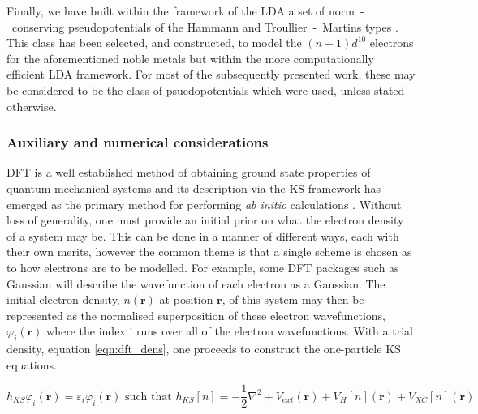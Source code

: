 Finally, we have built within the framework of the LDA a set of norm~-~conserving pseudopotentials of the Hammann \cite{Hamann} and Troullier~-~Martins \cite{Troullier} types \cite{FHI}. This class has been selected, and constructed, to model the $(n-1)d^{10}$ electrons for the aforementioned noble metals but within the more computationally efficient LDA framework. For most of the subsequently presented work, these may be considered to be the class of psuedopotentials which were used, unless stated otherwise.


\subsubsection{Auxiliary and numerical considerations}
\label{sec:dft_nums}

DFT is a well established method of obtaining ground state properties of quantum mechanical systems and its description via the KS framework has emerged as the primary method for performing \textit{ab initio} calculations \cite{K_Burke_Perspectives,Becke_Perspective}. Without loss of generality, one must provide an initial prior on what the electron density of a system may be. This can be done in a manner of different ways, each with their own merits, however the common theme is that a single scheme is chosen as to how electrons are to be modelled. For example, some DFT packages such as Gaussian will describe the wavefunction of each electron as a Gaussian. The initial electron density, $n(\textbf{r})$ at position $\textbf{r}$, of this system may then be represented as the normalised superposition of these electron wavefunctions, ${\varphi_{i}(\textbf{r})}$ where the index i runs over all of the electron wavefunctions. With a trial density, equation \ref{eqn:dft_dens}, one proceeds to construct the one-particle KS equations.

\begin{equation}
    h_{KS}\varphi_{i}(\textbf{r}) = \varepsilon_{i}\varphi_{i}(\textbf{r}) \text{ such that } h_{KS}[n] = -\frac{1}{2}\nabla^{2} + V_{ext}(\textbf{r}) + V_{H}[n](\textbf{r}) + V_{XC}[n](\textbf{r}) 
    \label{eqn:hKS}
\end{equation}

